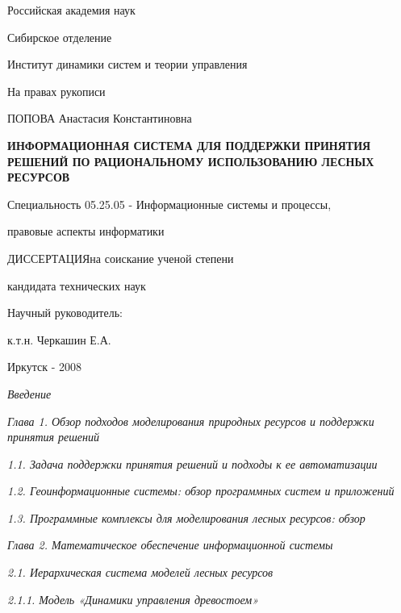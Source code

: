 \documentclass{article}
\begin{document}
\begin{center}
Российская академия наук

Сибирское отделение

Институт динамики систем и теории управления
\end{center}

\begin{flushright}
На правах рукописи
\end{flushright}

\begin{center}
ПОПОВА Анастасия Константиновна\label{OLEHLINK10}\label{OLEHLINK11}

\textbf{ИНФОРМАЦИОННАЯ СИСТЕМА ДЛЯ ПОДДЕРЖКИ ПРИНЯТИЯ 
РЕШЕНИЙ ПО РАЦИОНАЛЬНОМУ ИСПОЛЬЗОВАНИЮ ЛЕСНЫХ 
РЕСУРСОВ }

Специальность 05.25.05 - Информационные системы 
и процессы, 

правовые аспекты информатики 

ДИССЕРТАЦИЯна соискание ученой степени 

кандидата технических наук
\end{center}

\begin{flushright}
Научный руководитель:

к.т.н. Черкашин Е.А.
\end{flushright}

\begin{center}
Иркутск - 2008
\end{center}

\emph{Введение \pageref{HToc199746714}}

\emph{Глава 1. Обзор подходов моделирования природных 
ресурсов и поддержки принятия решений \pageref{HToc199746715}}

\emph{1.1. Задача поддержки принятия решений и подходы 
к ее автоматизации \pageref{HToc199746716}}

\emph{1.2. Геоинформационные системы: обзор программных 
систем и приложений \pageref{HToc199746717}}

\emph{1.3. Программные комплексы для  моделирования 
лесных ресурсов: обзор \pageref{HToc199746718}}

\emph{Глава 2. Математическое обеспечение информационной 
системы \pageref{HToc199746719}}

\emph{2.1. Иерархическая система моделей лесных 
ресурсов \pageref{HToc199746720}}

\emph{2.1.1. Модель «Динамики управления древостоем» \pageref{HToc199746721}}
\end{document}
